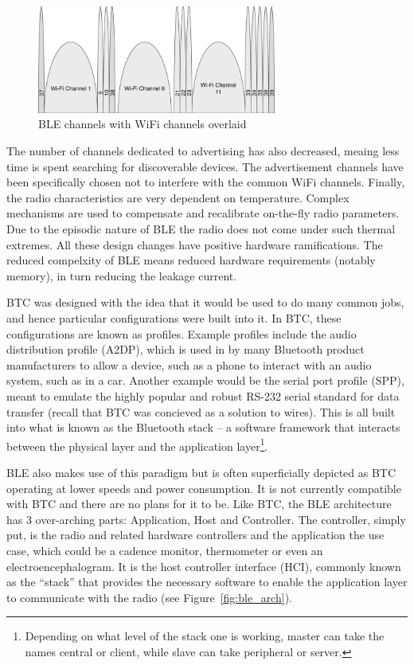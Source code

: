 \documentclass[]{article}
\begin{document}
\begin{figure}[htb]
	\begin{center}
		\includegraphics[width = 0.7\textwidth]{blechannelswifi}
	\end{center}
	\caption{\ac{BLE} channels with WiFi channels overlaid}
	\label{fig:blechannelswifi}
\end{figure}


The number of channels dedicated to advertising has also decreased, meaing less time is spent searching for discoverable devices. The advertisement channels have been specifically chosen not to interfere with the common WiFi channels. Finally, the radio characteristics are very dependent on temperature. Complex mechanisms are used to compensate and recalibrate on-the-fly radio parameters. Due to the episodic nature of \ac{BLE} the radio does not come under such thermal extremes. All these design changes have positive hardware ramifications. The reduced compelxity of \ac{BLE} means reduced hardware requirements (notably memory), in turn reducing the leakage current. 

\ac{BTC} was designed with the idea that it would be used to do many common jobs, and hence particular configurations were built into it. In \ac{BTC}, these configurations are known as profiles. Example profiles include the audio distribution profile (A2DP), which is used in by many Bluetooth product manufacturers to allow a device, such as a phone to interact with an audio system, such as in a car. Another example would be the serial port profile (SPP), meant to emulate the highly popular and robust RS-232 serial standard for data transfer (recall that \ac{BTC} was concieved as a solution to wires). This is all built into what is known as the Bluetooth stack – a software framework that interacts between the physical layer and the application layer\footnote{Depending on what level of the stack one is working, master can take the names central or client, while slave can take peripheral or server.}.  

\ac{BLE} also makes use of this paradigm but is often superficially depicted as \ac{BTC} operating at lower speeds and power consumption. It is not currently compatible with \ac{BTC} and there are no plans for it to be. Like \ac{BTC}, the \ac{BLE} architecture has 3 over-arching parts: Application, Host and Controller. The controller, simply put, is the radio and related hardware controllers and the application the use case, which could be a cadence monitor, thermometer or even an electroencephalogram. It is the host controller interface (HCI), commonly known as the “stack” that provides the necessary software to enable the application layer to communicate with the radio (see Figure~\ref{fig:ble_arch}).
\end{document}
